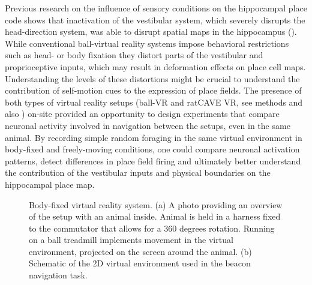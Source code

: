 Previous research on the influence of sensory conditions on the hippocampal place code shows that inactivation of the vestibular system, which severely disrupts the head-direction system, was able to disrupt spatial maps in the hippocampus (\cite{Stackman2002}). While conventional ball-virtual reality systems impose behavioral restrictions such as head- or body fixation they distort parts of the vestibular and proprioceptive inputs, which may result in deformation effects on place cell maps. Understanding the levels of these distortions might be crucial to understand the contribution of self-motion cues to the expression of place fields. The presence of both types of virtual reality setups (ball-VR and ratCAVE VR, see methods and also \cite{Thurley2014}) on-site provided an opportunity to design experiments that compare neuronal activity involved in navigation between the setups, even in the same animal. By recording simple random foraging in the same virtual environment in body-fixed and freely-moving conditions, one could compare neuronal activation patterns, detect differences in place field firing and ultimately better understand the contribution of the vestibular inputs and physical boundaries on the hippocampal place map.

\begin{figure}
\captionsetup{format=plain}
\caption[ball VR]{
Body-fixed virtual reality system. (a) A photo providing an overview of the setup with an animal inside. Animal is held in a harness fixed to the commutator that allows for a 360 degrees rotation. Running on a ball treadmill implements movement in the virtual environment, projected on the screen around the animal. (b) Schematic of the 2D virtual environment used in the beacon navigation task.
}
\label{fig:F9_ball_VR}
\end{figure}

